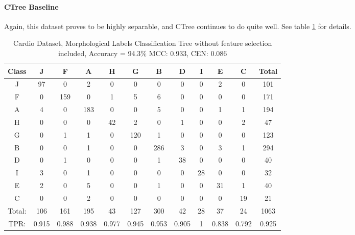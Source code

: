 \paragraph{CTree Baseline}  
Again, this dataset proves to be highly separable, and CTree continues to do quite well.  See table \ref{tab:cardiomorphctreebase} for details. 
\begin{table}[h!]
	\centering
	\begin{tabular}{|c|c|c|c|c|c|c|c|c|c|c|c|}
	\hline
		Class&J&F&A&H&G&B&D&I&E&C&Total\\
\hline
		J&97&0&2&0&0&0&0&0&2&0&101\\
		F&0&159&0&1&5&6&0&0&0&0&171\\
		A&4&0&183&0&0&5&0&0&1&1&194\\
		H&0&0&0&42&2&0&1&0&0&2&47\\
		G&0&1&1&0&120&1&0&0&0&0&123\\
		B&0&0&1&0&0&286&3&0&3&1&294\\
		D&0&1&0&0&0&1&38&0&0&0&40\\
		I&3&0&1&0&0&0&0&28&0&0&32\\
		E&2&0&5&0&0&1&0&0&31&1&40\\
		C&0&0&2&0&0&0&0&0&0&19&21\\\hline
		Total:&106&161&195&43&127&300&42&28&37&24&1063\\
		TPR:&0.915&0.988&0.938&0.977&0.945&0.953&0.905&1&0.838&0.792&0.925\\
		\hline
	\end{tabular}
	\caption[Cardiotocology Morphology: Classification Tree  Confusion Matrix]{Cardio Dataset, Morphological Labels Classification Tree without feature selection included, Accuracy = 94.3\% MCC: 0.933, CEN: 0.086}
	\label{tab:cardiomorphctreebase}
\end{table}


